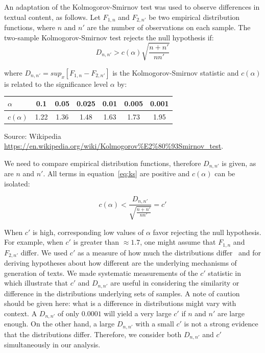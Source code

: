 An adaptation of the Kolmogorov-Smirnov test was used to observe differences in textual content, as follows.
Let $F_{1,n}$ and $F_{2,n'}$ be two empirical distribution functions, where $n$ and $n'$ are the number of observations on each sample.
The two-sample Kolmogorov-Smirnov test rejects the null hypothesis if:
\begin{equation}\label{eq:ks}
D_{n,n'} > c(\alpha)\sqrt{\frac{n+n'}{nn'}}
\end{equation}

\noindent where $D_{n,n'}=sup_x[F_{1,n}-F_{2,n'}]$ is the Kolmogorov-Smirnov statistic
and $c(\alpha)$ is related to the significance level $\alpha$ by:

\begin{table}[H]
\centering
\begin{tabular}{|l||c|c|c|c|c|c|}\hline
$\alpha$ & 0.1 & 0.05 & 0.025 & 0.01 & 0.005 & 0.001 \\\hline
$c(\alpha)$ & 1.22 & 1.36 & 1.48 & 1.63 & 1.73 & 1.95 \\\hline
\end{tabular}
\begin{flushleft}\footnotesize
Source: Wikipedia \url{https://en.wikipedia.org/wiki/Kolmogorov%E2%80%93Smirnov_test}.\
\end{flushleft}
\end{table}

We need to compare empirical distribution functions,
therefore $D_{n,n'}$ is given, as are $n$ and $n'$.
All terms in equation~\ref{eq:ks} are positive and $c(\alpha)$ can be isolated:

\begin{equation}\label{eq:ks2}
c(\alpha) < \frac{D_{n,n'}}{\sqrt{\frac{n+n'}{nn'}}} = c'
\end{equation}

When $c'$ is high, corresponding low values of $\alpha$ favor rejecting the null hypothesis.
For example, when $c'$ is greater than $\approx 1.7$, one might assume that $F_{1,n}$ and $F_{2,n'}$ differ.
We used $c'$ as a measure of how much
the distributions differ~\cite{kolm}
and for deriving hypotheses
about how different are the underlying mechanisms of generation of texts.
We made systematic measurements of the $c'$ statistic in~\cite{kolmSmir}
which illustrate that $c'$ and $D_{n,n'}$ are useful in considering the
similarity or difference in the distributions underlying sets of samples.
A note of caution should be given here: what is a difference in distributions
might vary with context.
A $D_{n,n'}$ of only $0.0001$ will yield a very large $c'$ if $n$ and $n'$ are large enough.
On the other hand, a large $D_{n,n'}$ with a small $c'$ is not a strong evidence that
the distributions differ.
Therefore, we consider both $D_{n,n'}$ and $c'$ simultaneously in our analysis.

